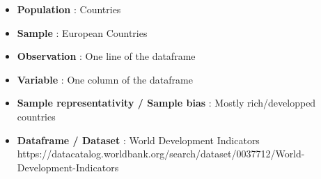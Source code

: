 \documentclass{beamer}
\begin{document}

\begin{frame}
    \begin{itemize}
        \item \textbf{Population} : Countries
        \vspace{0.2cm}
        \item \textbf{Sample} : European Countries
        \vspace{0.2cm}
        \item \textbf{Observation} : One line of the dataframe
        \vspace{0.2cm}
        \item \textbf{Variable} : One column of the dataframe
        \vspace{0.2cm}
        \item \textbf{Sample representativity / Sample bias} : Mostly rich/developped countries
        \vspace{0.2cm}
        \item \textbf{Dataframe / Dataset} : World Development Indicators \\
        https://datacatalog.worldbank.org/search/dataset/0037712/World-Development-Indicators
    \end{itemize}
\end{frame}
\end{document}
